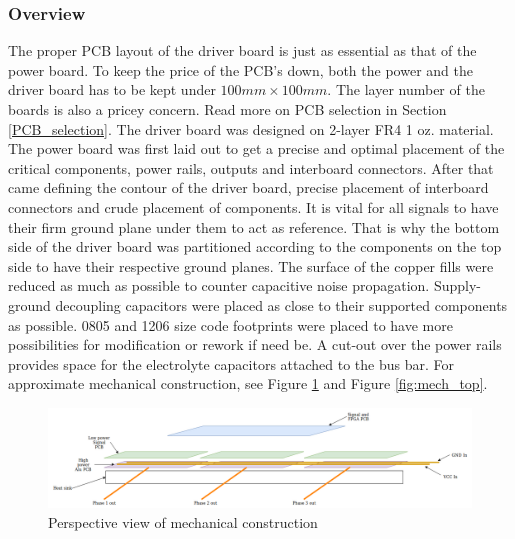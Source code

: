 \subsubsection{Overview}

The proper PCB layout of the driver board is just as essential as that of the power board. To keep the price of the PCB's down, both the power and the driver board has to be kept under $100mm \times 100mm$. The layer number of the boards is also a pricey concern. Read more on PCB selection in Section \ref{PCB_selection}. The driver board was designed on 2-layer FR4 1 oz. material. \\

The power board was first laid out to get a precise and optimal placement of the critical components, power rails, outputs and interboard connectors. After that came defining the contour of the driver board, precise placement of interboard connectors and crude placement of components. It is vital for all signals to have their firm ground plane under them to act as reference. That is why the bottom side of the driver board was partitioned according to the components on the top side to have their respective ground planes. The surface of the copper fills were reduced as much as possible to counter capacitive noise propagation. Supply-ground decoupling capacitors were placed as close to their supported components as possible. 0805 and 1206 size code footprints were placed to have more possibilities for modification or rework if need be. A cut-out over the power rails provides space for the electrolyte capacitors attached to the bus bar. For approximate mechanical construction, see Figure \ref{fig:mech_persp} and Figure \ref{fig:mech_top}.

\begin{figure}[H]
	\centering
	\includegraphics[width=1\textwidth]{pictures/hardware/Power_Board/mechanical_persp_new.png}
	\caption{Perspective view of mechanical construction}
	\label{fig:mech_persp}
\end{figure}

